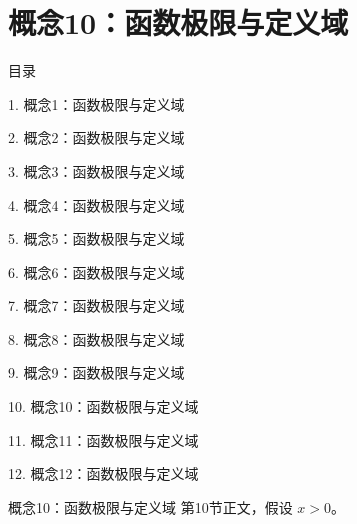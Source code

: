 \documentclass[aspectratio=169,10pt,fontset=fandol]{ctexbeamer}
\begin{document}
\section{概念10：函数极限与定义域}
\begin{frame}[t,fragile]{目录}
\small
{\color{black}\small 1. 概念1：函数极限与定义域\par}\vspace{0.22em}
{\color{black}\small 2. 概念2：函数极限与定义域\par}\vspace{0.22em}
{\color{black}\small 3. 概念3：函数极限与定义域\par}\vspace{0.22em}
{\color{black}\small 4. 概念4：函数极限与定义域\par}\vspace{0.22em}
{\color{black}\small 5. 概念5：函数极限与定义域\par}\vspace{0.22em}
{\color{black}\small 6. 概念6：函数极限与定义域\par}\vspace{0.22em}
{\color{black}\small 7. 概念7：函数极限与定义域\par}\vspace{0.22em}
{\color{black}\small 8. 概念8：函数极限与定义域\par}\vspace{0.22em}
{\color{black}\small 9. 概念9：函数极限与定义域\par}\vspace{0.22em}
{\color{blue}\small 10. 概念10：函数极限与定义域\par}\vspace{0.22em}
{\color{gray!40}\small 11. 概念11：函数极限与定义域\par}\vspace{0.22em}
{\color{gray!40}\small 12. 概念12：函数极限与定义域\par}\vspace{0.22em}
\end{frame}
\begin{frame}[t,fragile]{概念10：函数极限与定义域}
\normalsize
{\normalsize
第10节正文，假设 $x>0$。
}
\end{frame}
\end{document}
